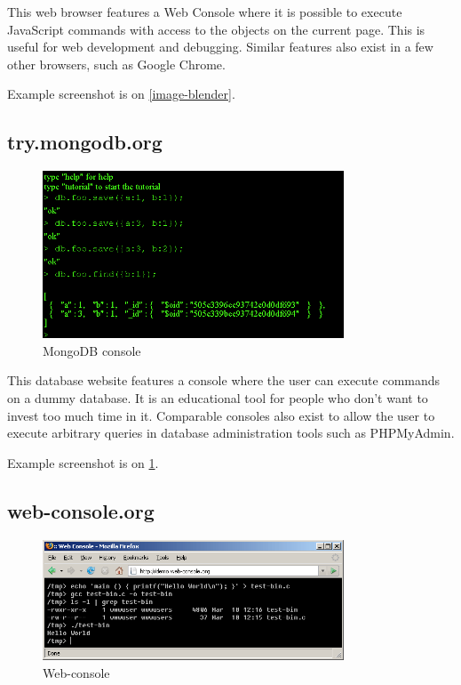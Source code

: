 This web browser features a Web Console where it is possible to execute JavaScript commands with access to the objects on the current page. This is useful for web development and debugging. Similar features also exist in a few other browsers, such as Google Chrome.

Example screenshot is on \ref{image-blender}.

\subsection{try.mongodb.org}

\begin{figure}
\centering
\includegraphics[width = 0.8\textwidth]{image/mongodb.png}
\caption{MongoDB console}
\label{image-mongo}
\end{figure}

This database website features a console where the user can execute commands on a dummy database. It is an educational tool for people who don't want to invest too much time in it. Comparable consoles also exist to allow the user to execute arbitrary queries in database administration tools such as PHPMyAdmin.

Example screenshot is on \ref{image-mongo}.

\subsection{web-console.org}

\begin{figure}
\centering
\includegraphics[width = 0.8\textwidth]{image/webconsole.png}
\caption{Web-console}
\label{image-webconsole}
\end{figure}

